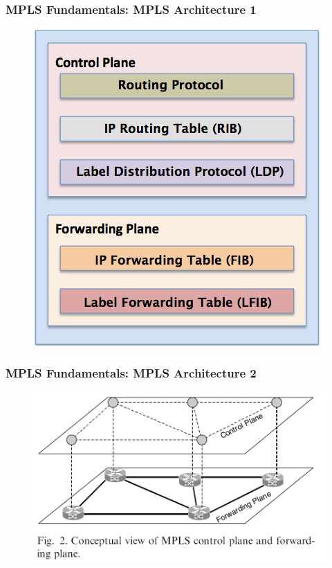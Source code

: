 \documentclass[12pt]{beamer}
\begin{document}
\begin{frame}
  \frametitle{MPLS Fundamentals: MPLS Architecture 1}
  \begin{figure}[h]
    \begin{center}
      \includegraphics[scale=0.40]{mpls-arch.png}
    \end{center}
  \end{figure}    
\end{frame}

\begin{frame}
  \frametitle{MPLS Fundamentals: MPLS Architecture 2}
  \begin{figure}[h]
    \begin{center}
      \includegraphics[scale=0.40]{separation.png}
    \end{center}
  \end{figure}
\end{frame}
\end{document}
